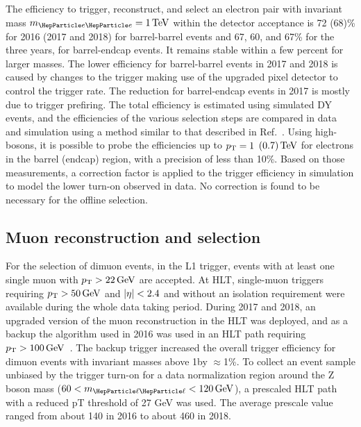 \documentclass[11pt,twoside,a4paper,cmspaper,final,collab]{cms-tdr}
\begin{document}
The efficiency to trigger, reconstruct, and select an electron pair with invariant mass $\mee =1\TeV$ within the detector acceptance is 72 (68)\% for 2016 (2017 and 2018) for barrel-barrel events and 67, 60, and 67\% for the three years, for barrel-endcap events. It  remains stable within a few percent for larger masses. The lower efficiency for barrel-barrel events in 2017 and 2018 is caused by changes to the trigger making use of the upgraded pixel detector to control the trigger rate. The reduction for barrel-endcap events in 2017 is mostly due to trigger prefiring. The total efficiency is estimated using simulated DY events, and the efficiencies of the various selection steps are compared in data and simulation using a method similar to that described in Ref.~\cite{Sirunyan:2020ycc}. Using high-\pt \PZ bosons, it is possible to probe the efficiencies up to $p_{\mathrm{T}} = 1$ $(0.7)\,\text{Te\hspace{-.08em}V}$ for electrons in the barrel (endcap) region, with a precision of less than 10\%. Based on those measurements, a correction factor is applied to the trigger efficiency in simulation to model the lower \pt turn-on observed in data. No correction is found to be necessary for the offline selection.

\subsection{Muon reconstruction and selection}
For the selection of dimuon events, in the L1 trigger, events with at least one single muon with $p_{\mathrm{T}} > 22\,\text{Ge\hspace{-.08em}V}$ are accepted. At HLT, single-muon triggers requiring $p_{\mathrm{T}} > 50\,\text{Ge\hspace{-.08em}V}$ and $\lvert \eta \rvert< 2.4$ and without an isolation requirement were available during the whole data taking period. During 2017 and 2018, an upgraded version of the muon reconstruction in the HLT was deployed, and  as a backup the algorithm used in 2016 was used in an HLT path requiring $p_{\mathrm{T}} > 100\,\text{Ge\hspace{-.08em}V}$~\cite{Sirunyan:2021zrd}. The backup trigger increased the overall trigger efficiency for dimuon events with invariant masses above 1\TeV by $\approx$1\%. To collect an event sample unbiased by the trigger turn-on for a data normalization region around the Z boson mass ($60 < \mll < 120\GeV$), a prescaled HLT path with a reduced pT threshold of 27 GeV was used. The average prescale value ranged from about 140 in 2016 to about 460 in 2018.
\end{document}
